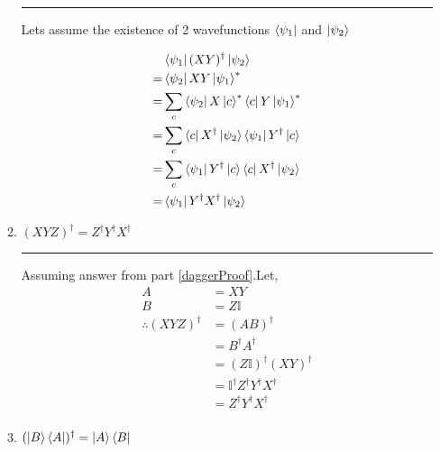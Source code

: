 \documentclass[12pt, oneside]{article}
\newenvironment{answer}
  {\vspace*{0.2cm} \rule{12cm}{0.02cm} \vspace*{0.2cm}}
  {\vspace*{0.2cm}}
\begin{document}
\begin{enumerate}
\begin{enumerate}
    \begin{answer}\label{daggerProof}
      Lets assume the existence of 2 wavefunctions $\bra{\psi_1}$ and $\ket{\psi_2}$

      \begin{align*}
          &\bra{\psi_1}(XY)^\dagger\ket{\psi_2}\\
        = &\bra{\psi_2}XY\ket{\psi_1}^*\\
        = &\sum_c\bra{\psi_2}X\ket{c}^*\bra{c}Y\ket{\psi_1}^*\\
        = &\sum_c\bra{c}X^\dagger\ket{\psi_2}\bra{\psi_1}Y^\dagger\ket{c}\\
        = &\sum_c\bra{\psi_1}Y^\dagger\ket{c}\bra{c}X^\dagger\ket{\psi_2}\\
        = &\bra{\psi_1}Y^\dagger X^\dagger\ket{\psi_2}\\
      \end{align*}
    \end{answer}

    \item $(XYZ)^\dagger = Z^\dagger Y^\dagger X^\dagger$

    \begin{answer}
      Assuming answer from part \ref{daggerProof}.Let,
      \begin{align*}
        A &= XY\\
        B &= Z\mathbb{I}\\
        \therefore (XYZ)^\dagger &= (AB)^\dagger\\
        &= B^\dagger A^\dagger\\
        &= (Z\mathbb{I})^\dagger (XY)^\dagger \\
        &= \mathbb{I}^\dagger Z^\dagger Y^\dagger X^\dagger\\
        &= Z^\dagger Y^\dagger X^\dagger\\
      \end{align*}
    \end{answer}

    \item $(\ket{B}\bra{A})^\dagger = \ket{A}\bra{B}$


\end{enumerate}
\end{enumerate}
\end{document}
